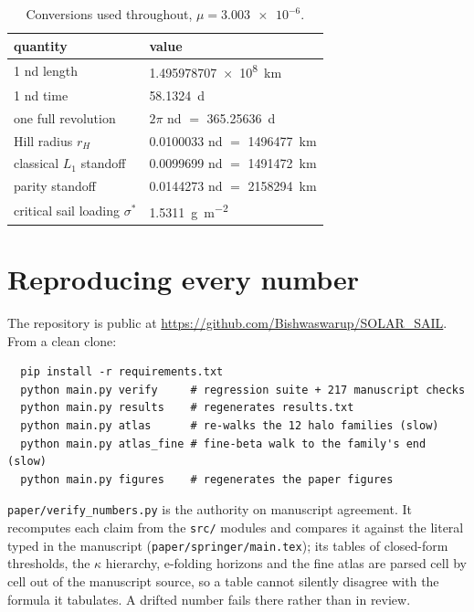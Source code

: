 \documentclass[11pt,a4paper]{article}
\begin{document}
\begin{table}[h]
  \centering
  \caption{Conversions used throughout, $\mu=\num{3.003e-6}$.}
  \begin{tabular}{ll}
    \toprule
    quantity & value \\
    \midrule
    1 nd length              & \SI{1.495978707e8}{\kilo\metre} \\
    1 nd time                & \SI{58.1324}{\day} \\
    one full revolution      & $2\pi$ nd $=$ \SI{365.25636}{\day} \\
    Hill radius $r_H$        & \num{0.0100033} nd $=$ \SI{1496477}{\kilo\metre} \\
    classical $L_1$ standoff & \num{0.0099699} nd $=$ \SI{1491472}{\kilo\metre} \\
    parity standoff          & \num{0.0144273} nd $=$ \SI{2158294}{\kilo\metre} \\
    critical sail loading $\sigma^\ast$ & \SI{1.5311}{\gram\per\metre\squared} \\
    \bottomrule
  \end{tabular}
\end{table}

\section{Reproducing every number}\label{sec:repro}

The repository is public at
\url{https://github.com/Bishwaswarup/SOLAR_SAIL}. From a clean clone:
\begin{verbatim}
  pip install -r requirements.txt
  python main.py verify     # regression suite + 217 manuscript checks
  python main.py results    # regenerates results.txt
  python main.py atlas      # re-walks the 12 halo families (slow)
  python main.py atlas_fine # fine-beta walk to the family's end (slow)
  python main.py figures    # regenerates the paper figures
\end{verbatim}
\texttt{paper/verify\_numbers.py} is the authority on manuscript agreement. It
recomputes each claim from the \texttt{src/} modules and compares it against the
literal typed in the manuscript (\texttt{paper/springer/main.tex}); its tables
of closed-form thresholds, the $\kappa$ hierarchy, e-folding horizons and the
fine atlas are parsed cell by cell out of the manuscript source, so a table cannot silently disagree with the
formula it tabulates. A drifted number fails there rather than in review.
\end{document}
